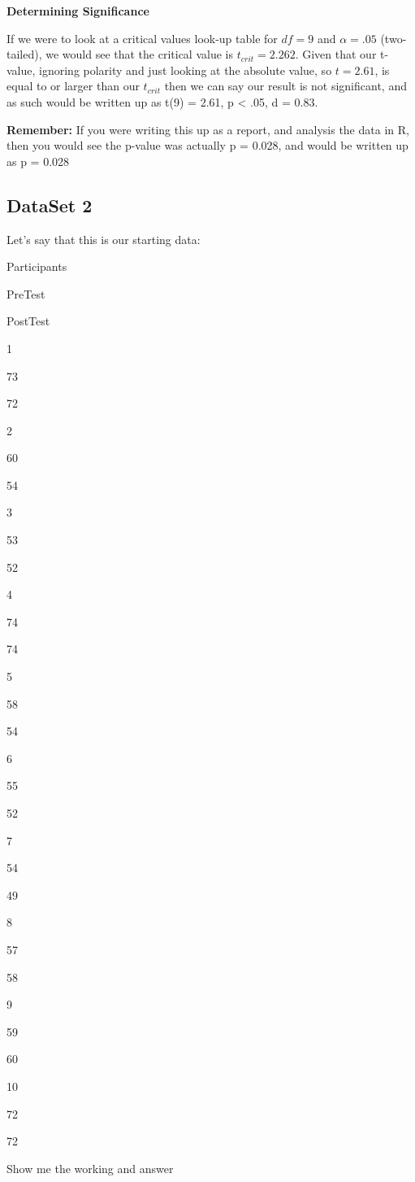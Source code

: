 \documentclass[
  oneside]{book}
\begin{document}
\textbf{Determining Significance}

If we were to look at a critical values look-up table for \(df = 9\) and \(\alpha = .05\) (two-tailed), we would see that the critical value is \(t_{crit} = 2.262\). Given that our t-value, ignoring polarity and just looking at the absolute value, so \(t = 2.61\), is equal to or larger than our \(t_{crit}\) then we can say our result is not significant, and as such would be written up as t(9) = 2.61, p \textless{} .05, d = 0.83.

\textbf{Remember:} If you were writing this up as a report, and analysis the data in R, then you would see the p-value was actually p = 0.028, and would be written up as p = 0.028

\hypertarget{dataset-2-2}{%
\subsection{DataSet 2}\label{dataset-2-2}}

Let's say that this is our starting data:

Participants

PreTest

PostTest

1

73

72

2

60

54

3

53

52

4

74

74

5

58

54

6

55

52

7

54

49

8

57

58

9

59

60

10

72

72

Show me the working and answer
\end{document}
